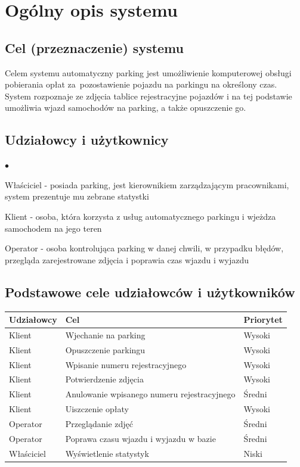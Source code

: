\chapter{Ogólny opis systemu}
\label{cha:wprowadzenie}


\section{Cel (przeznaczenie) systemu}
\label{sec:celePracy}

Celem systemu automatyczny parking jest umożliwienie komputerowej obsługi pobierania opłat za~pozostawienie pojazdu na parkingu na określony czas. System rozpoznaje ze zdjęcia tablice rejestracyjne pojazdów i na tej podstawie umożliwia wjazd samochodów na parking, a także opuszczenie go.

\section{Udziałowcy i użytkownicy}

\begin{list}{$\bullet$}{}
\item Właściciel - posiada parking, jest kierownikiem zarządzającym pracownikami, system prezentuje mu zebrane statystki
\item Klient - osoba, która korzysta z usług automatycznego parkingu i wjeżdza samochodem na jego teren
\item Operator - osoba kontrolująca parking w danej chwili, w przypadku błędów, przegląda zarejestrowane zdjęcia i poprawia czas wjazdu i wyjazdu

\end{list}

\section{Podstawowe cele udziałowców i użytkowników}

\begin{table}[H]
	\begin{tabular}{|l|l|l|} \hline
	\textbf{Udziałowcy}	& \textbf{Cel} & \textbf{Priorytet} \\ \hline%
	Klient	& Wjechanie na parking & Wysoki \\
	Klient	& Opuszczenie parkingu & Wysoki \\
	Klient	& Wpisanie numeru rejestracyjnego & Wysoki \\
	Klient	& Potwierdzenie zdjęcia & Wysoki \\
	Klient	& Anulowanie wpisanego numeru rejestracyjnego & Średni \\
	Klient	& Uiszczenie opłaty & Wysoki \\
	Operator& Przeglądanie zdjęć & Średni \\
	Operator& Poprawa czasu wjazdu i wyjazdu w bazie & Średni \\
	Właściciel& Wyświetlenie statystyk & Niski \\ \hline
	\end{tabular}
\end{table}

